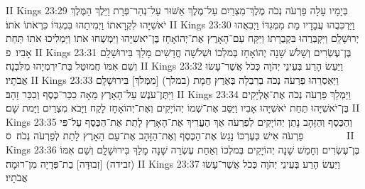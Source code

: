 II Kings 23:29	בְּיָמָיו עָלָה פַרְעֹה נְכֹה מֶלֶךְ־מִצְרַיִם עַל־מֶלֶךְ אַשּׁוּר עַל־נְהַר־פְּרָת וַיֵּלֶךְ הַמֶּלֶךְ יֹאשִׁיָּהוּ לִקְרָאתוֹ וַיְמִיתֵהוּ בִּמְגִדּוֹ כִּרְאֹתוֹ אֹתוֹ׃
II Kings 23:30	וַיַּרְכִּבֻהוּ עֲבָדָיו מֵת מִמְּגִדּוֹ וַיְבִאֻהוּ יְרוּשָׁלַ͏ִם וַיִּקְבְּרֻהוּ בִּקְבֻרָתוֹ וַיִּקַּח עַם־הָאָרֶץ אֶת־יְהוֹאָחָז בֶּן־יֹאשִׁיָּהוּ וַיִּמְשְׁחוּ אֹתוֹ וַיַּמְלִיכוּ אֹתוֹ תַּחַת אָבִיו׃ {פ}
II Kings 23:31	בֶּן־עֶשְׂרִים וְשָׁלֹשׁ שָׁנָה יְהוֹאָחָז בְּמלְכוֹ וּשְׁלֹשָׁה חֳדָשִׁים מָלַךְ בִּירוּשָׁלָ͏ִם וְשֵׁם אִמּוֹ חֲמוּטַל בַּת־יִרְמְיָהוּ מִלִּבְנָה׃
II Kings 23:32	וַיַּעַשׂ הָרַע בְּעֵינֵי יְהֹוָה כְּכֹל אֲשֶׁר־עָשׂוּ אֲבֹתָיו׃
II Kings 23:33	וַיַּאַסְרֵהוּ פַרְעֹה נְכֹה בְרִבְלָה בְּאֶרֶץ חֲמָת (במלך) [מִמְּלֹךְ] בִּירוּשָׁלָ͏ִם וַיִּתֶּן־עֹנֶשׁ עַל־הָאָרֶץ מֵאָה כִכַּר־כֶּסֶף וְכִכַּר זָהָב׃
II Kings 23:34	וַיַּמְלֵךְ פַּרְעֹה נְכֹה אֶת־אֶלְיָקִים בֶּן־יֹאשִׁיָּהוּ תַּחַת יֹאשִׁיָּהוּ אָבִיו וַיַּסֵּב אֶת־שְׁמוֹ יְהוֹיָקִים וְאֶת־יְהוֹאָחָז לָקַח וַיָּבֹא מִצְרַיִם וַיָּמת שָׁם׃
II Kings 23:35	וְהַכֶּסֶף וְהַזָּהָב נָתַן יְהוֹיָקִים לְפַרְעֹה אַךְ הֶעֱרִיךְ אֶת־הָאָרֶץ לָתֵת אֶת־הַכֶּסֶף עַל־פִּי פַרְעֹה אִישׁ כְּעֶרְכּוֹ נָגַשׂ אֶת־הַכֶּסֶף וְאֶת־הַזָּהָב אֶת־עַם הָאָרֶץ לָתֵת לְפַרְעֹה נְכֹה׃ {ס}        
II Kings 23:36	בֶּן־עֶשְׂרִים וְחָמֵשׁ שָׁנָה יְהוֹיָקִים בְּמלְכוֹ וְאַחַת עֶשְׂרֵה שָׁנָה מָלַךְ בִּירוּשָׁלָ͏ִם וְשֵׁם אִמּוֹ (זבידה) [זְבוּדָּה] בַת־פְּדָיָה מִן־רוּמָה׃
II Kings 23:37	וַיַּעַשׂ הָרַע בְּעֵינֵי יְהֹוָה כְּכֹל אֲשֶׁר־עָשׂוּ אֲבֹתָיו׃
